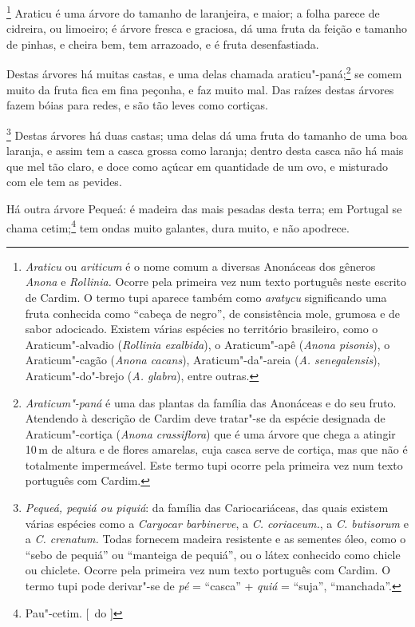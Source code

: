 \footnote{ \textit{Araticu} ou \textit{ariticum} é o
nome comum a diversas Anonáceas dos gêneros \textit{Anona} e 
\textit{Rollinia.} Ocorre pela primeira vez num texto português neste
escrito de Cardim. O termo tupi aparece também como \textit{aratycu}
significando uma fruta conhecida como ``cabeça de negro'', de
consistência mole, grumosa e de sabor adocicado. Existem várias
espécies no território brasileiro, como o Araticum"-alvadio
(\textit{Rollinia exalbida}), o Araticum"-apê (\textit{Anona pisonis}), 
o Araticum"-cagão (\textit{Anona cacans}), Araticum"-da"-areia
(\textit{A. senegalensis}), Araticum"-do"-brejo (\textit{A. glabra}), 
entre outras.} Araticu é uma árvore do tamanho de
laranjeira, e maior; a folha parece de cidreira, ou limoeiro; é árvore
fresca e graciosa, dá uma fruta da feição e tamanho de pinhas, e cheira
bem, tem arrazoado, e é fruta desenfastiada.

 Destas árvores há muitas castas, e uma delas chamada 
araticu"-paná;\footnote{ \textit{Araticum"-paná} é uma das plantas da família das
Anonáceas e do seu fruto. Atendendo à descrição de Cardim deve
tratar"-se da espécie designada de Araticum"-cortiça (\textit{Anona
crassiflora}) que é uma árvore que chega a atingir 10\,m de altura e de
flores amarelas, cuja casca serve de cortiça, mas que não é totalmente
impermeável. Este termo tupi ocorre pela primeira vez num texto
português com Cardim.} se comem muito da fruta fica em fina peçonha, e
faz muito mal. Das raízes destas árvores fazem bóias para redes, e são
tão leves como cortiças.

\footnote{ \textit{Pequeá, pequiá ou piquiá}: da
família das Cariocariáceas, das quais existem várias espécies como a 
\textit{Caryocar barbinerve}, a \textit{C. coriaceum.}, a \textit{C.
butisorum} e a \textit{C. crenatum.} Todas fornecem madeira resistente
e as sementes óleo, como o ``sebo de pequiá'' ou ``manteiga de pequiá'', ou
o látex conhecido como chicle ou chiclete. Ocorre pela primeira vez num
texto português com Cardim. O termo tupi pode derivar"-se de \textit{pé} = 
``casca'' + \textit{quiá} = ``suja'', ``manchada''.} Destas
árvores há duas castas; uma delas dá uma fruta do tamanho de uma boa
laranja, e assim tem a casca grossa como laranja; dentro desta casca
não há mais que mel tão claro, e doce como açúcar em quantidade de um
ovo, e misturado com ele tem as pevides.

 Há outra árvore Pequeá: é madeira das mais pesadas desta terra; em
Portugal se chama cetim;\footnote{ Pau"-cetim. [~do ]} tem ondas muito galantes, dura muito, e não
apodrece.

